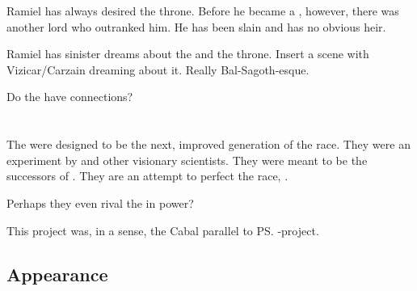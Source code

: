 
Ramiel has always desired the \Mystraacht{} throne. 
Before he became a \malach, however, there was another \Mystraacht{} lord who outranked him. 
He has been slain and has no obvious heir. 

Ramiel has sinister dreams about the \Mystraacht{} \matrix{} and the throne. 
Insert a scene with Vizicar/Carzain dreaming about it. 
Really Bal-Sagoth-esque. 


Do the \Mystraacht{} have \ophidian{} connections?















\section{\NeoResphan}
\index{\neoresphan}
The \neoresphain were designed to be the next, improved generation of the \resphan race. 
They were an experiment by  and other visionary scientists. 
They were meant to be the successors of \resphain. 
They are an attempt to perfect the \resphan{} race, . 

Perhaps they even rival the \satharioth{} in power? 

This project was, in a sense, the Cabal parallel to \ps{\Secherdamon} \Vizsherioch-project. 









\subsection{Appearance}

